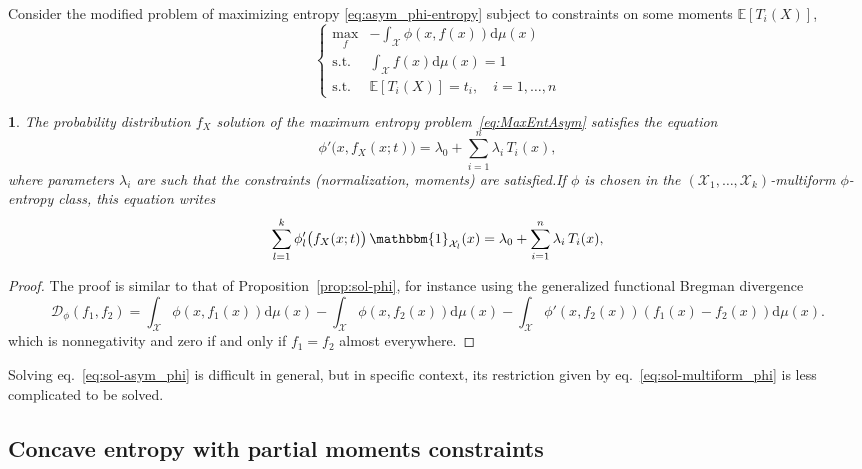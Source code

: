 \documentclass[english]{elsarticle}
\theoremstyle{definition}
\theoremstyle{plain}
\newtheorem{prop}{\protect\propositionname}
\theoremstyle{plain}
\def\dmu{\mathrm{d}\mu}
\def\fD{\mathcal{D}}
\def\X{\mathcal{X}}
\def\un{\mathbbm{1}}
\newcommand{\Esp}[1]{\mathbb{E}\left[ #1 \right]}
\providecommand{\propositionname}{Proposition}
\begin{document}
\

Consider the  modified problem of  maximizing entropy \eqref{eq:asym_phi-entropy}
subject to constraints on some moments $\Esp{T_i(X)}$,
\begin{equation}\label{eq:MaxEntAsym}
\begin{cases}
\max_f & {\displaystyle - \int_\X \phi(x,f(x)) \dmu(x)}\\[5mm]
\text{s.t. } & {\displaystyle \int_\X f(x) \dmu(x) = 1}\\[5mm]
\text{s.t. } & \Esp{T_i(X)} = t_i, \quad i = 1 , \ldots , n
\end{cases}
\end{equation}

\begin{prop}\label{prop:sol-asym_phi}
  The   probability  distribution   $f_X$  solution   of  the   maximum  entropy
  problem~\eqref{eq:MaxEntAsym} satisfies the equation
  \begin{equation}\label{eq:sol-asym_phi}
    \phi'\big(x,f_X(x;t)\big) = \lambda_0 + \sum_{i=1}^n \lambda_i \, T_i(x),
  \end{equation}
  where  parameters $\lambda_i$  are such  that the  constraints (normalization,
  moments) are satisfied.\newline  If $\phi$ is chosen in the  $(\X_1 , \ldots ,
  \X_k)$-multiform $\phi$-entropy class, this equation writes
  \begin{equation}\label{eq:sol-multiform_phi}
    \sum_{l=1}^k \phi_l'\big(f_X(x;t)\big) \, \un_{\X_l}(x) = \lambda_0 +
    \sum_{i=1}^n \lambda_i \, T_i(x),
  \end{equation}
\end{prop}
\begin{proof}
  The proof is similar to that of Proposition~\ref{prop:sol-phi}, for instance
  using the generalized functional Bregman divergence
\[
\fD_\phi(f_1,f_2)  =  \int_\X \phi(x,f_1(x))  \dmu(x)  - \int_\X  \phi(x,f_2(x))
\dmu(x) - \int_\X \phi'(x,f_2(x)) \left( f_1(x) - f_2(x) \right) \dmu(x).
\]
which is nonnegativity    and  zero   if  and   only  if   $f_1 = f_2$  almost
everywhere.
\end{proof}

Solving eq.~\eqref{eq:sol-asym_phi}  is difficult  in general, but  in specific
context,  its  restriction given  by  eq.~\eqref{eq:sol-multiform_phi} is  less
complicated to be solved.



\subsection{Concave entropy with partial moments constraints}
\label{subsec:ConcaveMultiPhiEnt}
\end{document}
